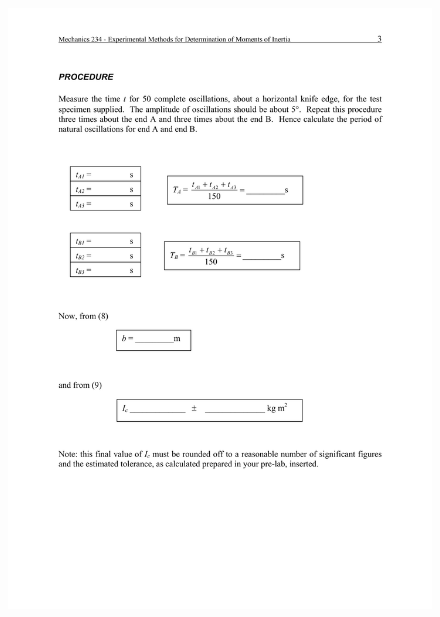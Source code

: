 \begin{figure}
 \includegraphics[width=\linewidth]{lab1/lab1-3}
  \caption*{}
\label{}
\end{figure}
